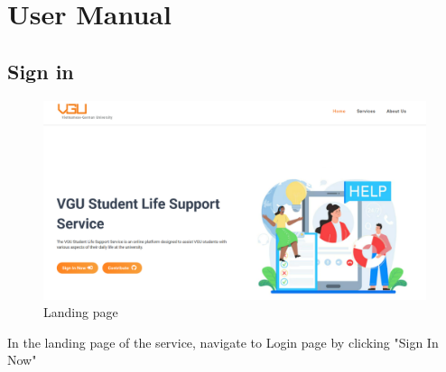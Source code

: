\section{User Manual}

\subsection{Sign in}
\begin{figure}[H]
	\centering
	\includegraphics[width=1.\linewidth]{graphics/gui/user/landing}
	\caption{Landing page}
	\label{fig:landing}
\end{figure}

In the landing page of the service, navigate to Login page by clicking "Sign In Now"


